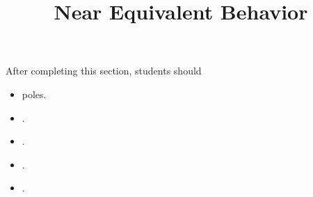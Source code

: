 \documentclass{ximera}
\title{Near Equivalent Behavior}
\begin{document}
\begin{abstract}
\end{abstract}
\maketitle

\begin{sectionOutcomes}
After completing this section, students should 

\begin{itemize}
\item poles.
\item .
\item .
\item .
\item .
\end{itemize}
\end{sectionOutcomes}
\end{document}
